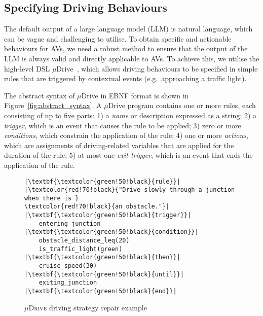 \subsection{Specifying Driving Behaviours}
\label{sec:udrive grammar}
The default output of a large language model (LLM) is natural language, which can be vague and challenging to utilise. To obtain specific and actionable behaviours for AVs, we need a robust method to ensure that the output of the LLM is always valid and directly applicable to AVs.
To achieve this, we utilise the high-level DSL $\mu$Drive~\cite{wang2024mudrive}, which allows driving behaviours to be specified in simple rules that are triggered by contextual events (e.g.~approaching a traffic light). 

The abstract syntax of $\mu$Drive in EBNF format is shown in Figure~\ref{fig:abstract_syntax}.
A $\mu$Drive program contains one or more rules, each consisting of up to five parts: 
1) a \emph{name} or description expressed as a string;
2) a \emph{trigger}, which is an event that causes the rule to be applied;
3) zero or more \emph{conditions}, which constrain the application of the rule;
4) one or more \emph{actions}, which are assignments of driving-related variables that are applied for the duration of the rule;
5) at most one \emph{exit trigger}, which is an event that ends the application of the rule.

\begin{figure}[t]
\begin{verbatim}
|\textbf{\textcolor{green!50!black}{rule}}| |\textcolor{red!70!black}{"Drive slowly through a junction when there is }
\textcolor{red!70!black}{an obstacle."}|
|\textbf{\textcolor{green!50!black}{trigger}}| 
    entering_junction 
|\textbf{\textcolor{green!50!black}{condition}}| 
    obstacle_distance_leq(20)
    is_traffic_light(green)
|\textbf{\textcolor{green!50!black}{then}}|
    cruise_speed(30)
|\textbf{\textcolor{green!50!black}{until}}|
    exiting_junction
|\textbf{\textcolor{green!50!black}{end}}|
    \end{verbatim}
  \caption{\textsc{$\mu$Drive} driving strategy repair example}
  \label{lst:example}
  \vspace{-0.5cm}
\end{figure}


